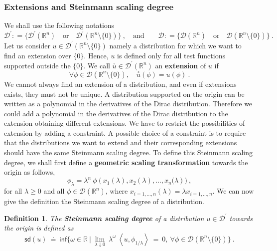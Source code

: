 \documentclass[11pt]{book}
\newcommand{\sd}{\mathsf{sd}}
\renewcommand{\inf}{\mathsf{inf}}
\newcommand{\sm}[1]{\left\langle#1\right\rangle}
\newcommand{\exte}[1]{\overset{\circ}{#1}}
\newcommand{\Dcal}{\mathcal{D}}
\newcommand{\Rbb}{\mathbb{R}}
\theoremstyle{break}
\newtheorem{definition}{Definition}[chapter]
\begin{document}
\subsubsection{Extensions and Steinmann scaling degree}


We shall use the following notations
%
\begin{equation*}
\Dcal^\prime : = \bigg\{ \Dcal^\prime(\Rbb^n) \quad \mbox{or} \quad \Dcal^\prime(\Rbb^n\setminus\{0\}) \bigg\} \ , \quad \mbox{and} \qquad \Dcal : = \bigg\{ \Dcal(\Rbb^n) \quad \mbox{or} \quad \Dcal(\Rbb^n\setminus\{0\}) \bigg\} \ .
\end{equation*}
%
Let us consider $u\in \Dcal^\prime(\Rbb^n \setminus \{0\})$ namely a distribution for which we want to find an extension over $\{0\}$. Hence, $u$ is defined only for all test functions supported outside the $\{0\}$. We call $\exte{u} \in \Dcal^\prime(\Rbb^n)$ an \textbf{extension} of $u$ if 
%
\begin{equation*}
 \forall \phi \in \Dcal\left(\Rbb^n \setminus \{0\} \right), \quad \exte{u}(\phi) = u(\phi) \ .
\end{equation*}
%
We cannot always find an extension of a distribution, and even if extensions exists, they must not be unique. A distribution supported on the origin can be written as a polynomial in the derivatives of the Dirac distribution. Therefore we could add a polynomial in the derivatives of the Dirac distribution to the extension obtaining different extensions. We have to restrict the possibilities of extension by adding a constraint. A possible choice of a constraint is to require that the distributions we want to extend and their corresponding extensions should have the same Steinmann scaling degree. To define this Steinmann scaling degree, we shall first define a \textbf{geometric scaling transformation} towards the origin as follows,
%
\begin{equation}
\phi_\lambda = \lambda^{n} \ \phi\left(x_1(\lambda ),x_2(\lambda) , \dots , x_n(\lambda\right)) \ , 
\label{eq:geo_scaling_transfo_numeric}
\end{equation}
%
for all $\lambda \geq 0$ and all $\phi \in \Dcal(\Rbb^n)$, where $x_{i=1,\dots,n}(\lambda) = \lambda x_{i=1,\dots,n}$. We can now give the definition the Steinmann scaling degree of a distribution.


\begin{definition}\label{def:steinmann_scaling_degree}
The \textbf{Steinmann scaling degree} of a distribution $u \in \Dcal^\prime$ towards the origin is defined as 
%
\begin{equation*}
\sd(u) \ \doteq \ \inf\bigg\{ \omega \in \Rbb \ \bigg| \ \lim_{\lambda \downarrow 0} \ \lambda^\omega \ \sm{u,\phi_{1/\lambda}} \ = \ 0, \ \forall \phi\in\Dcal(\Rbb^n \setminus \{0\}) \bigg\} \ .
\end{equation*}
%
\end{definition}
\end{document}
